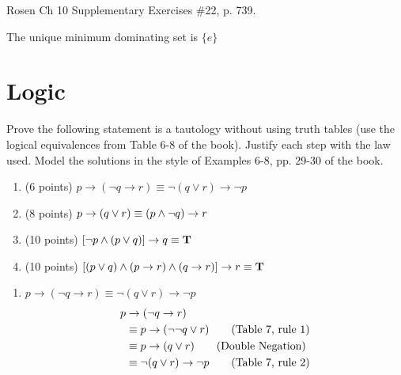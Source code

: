 \begin{questions}
  \ifprintanswers
        \vspace{-10pt}
  \fi
{} Rosen Ch 10 Supplementary Exercises \#22, p. 739. 
  \ifprintanswers
        \vspace{-10pt}
  \fi
  \begin{solution}
    The unique minimum dominating set is $\{e \}$
  \end{solution}



\section*{Logic}
\ifprintanswers
\vspace{-10pt}
\fi


 Prove the following statement is a tautology without using truth tables (use the logical equivalences from Table 6-8 of the book).  Justify each step with the law used.  Model the solutions in the style of Examples 6-8, pp. 29-30 of the book.


\begin{enumerate}[label=(\alph*),itemsep=0pt,parsep=0pt,
topsep=0pt,partopsep=0pt]
    \item (6 points) $p \rightarrow (\neg q \rightarrow r) \equiv \neg(q \vee r)
    \rightarrow \neg p$

    \item (8 points) $p \rightarrow (q \vee r) \equiv (p \wedge \neg q) \rightarrow r$

    \item (10 points) $ [ \neg p \wedge (p \vee q) ] \rightarrow q \equiv \mathbf{T}$
    
    \item (10 points) $[(p \vee q) \wedge (p \rightarrow r) \wedge (q \rightarrow r)] \rightarrow r \equiv \mathbf{T}$
\end{enumerate}
\begin{solution}
  \begin{enumerate}[label=(\alph*),itemsep=0pt,parsep=0pt,
topsep=0pt,partopsep=0pt]
    \item $p \rightarrow (\neg q \rightarrow r) \equiv 
      \neg(q \vee r) \rightarrow \neg p$
    \begin{align*}
      p & \rightarrow (\neg q \rightarrow r) \\
      & \equiv p \rightarrow (\neg \neg q \vee r) \tag{Table 7, rule 1} \\
      & \equiv p \rightarrow (q \vee r) \tag{Double Negation} \\
      & \equiv \neg (q \vee r) \rightarrow \neg p \tag{Table 7, rule 2} \\
    \end{align*}


\end{enumerate}
\end{solution}
\end{questions}

